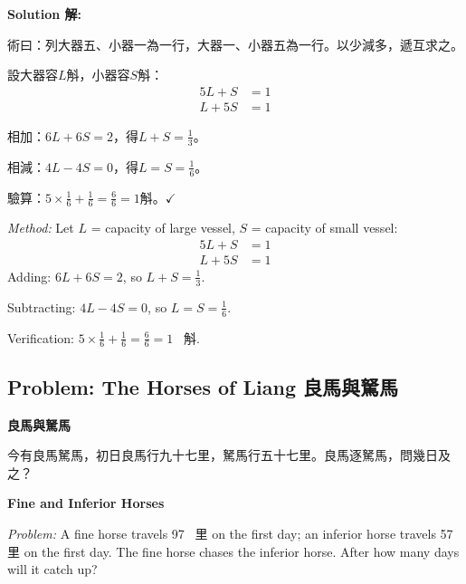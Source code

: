 \documentclass[11pt,a4paper]{article}
\newcommand{\zh}[1]{{\CJKfamily{\CJKrmdefault} #1}}
\newenvironment{chside}{%
  \begin{minipage}[t]{0.48\textwidth}%
  \setlength{\parindent}{1.5em}%
  \linespread{1.25}\selectfont%
  \small%
}{%
  \end{minipage}%
}
\newenvironment{enside}{%
  \hfill\begin{minipage}[t]{0.48\textwidth}%
  \setlength{\parindent}{1em}%
  \linespread{1.15}\selectfont%
  \small%
}{%
  \end{minipage}%
}
\newenvironment{solution}{%
  \par\medskip\noindent\textbf{\textcolor{notecolor}{Solution \zh{解}:}}\par\nopagebreak
  \small\setlength{\parindent}{1em}%
}{%
  \par\medskip%
}
\begin{document}
\begin{solution}
\noindent\begin{chside}
\zh{術曰：列大器五、小器一為一行，大器一、小器五為一行。以少減多，遞互求之。}

設大器容$L$斛，小器容$S$斛：
\begin{align*}
5L + S &= 1 \\
L + 5S &= 1
\end{align*}

相加：$6L + 6S = 2$，得$L + S = \frac{1}{3}$。

相減：$4L - 4S = 0$，得$L = S = \frac{1}{6}$。

驗算：$5 \times \frac{1}{6} + \frac{1}{6} = \frac{6}{6} = 1$斛。$\checkmark$
\end{chside}%
\begin{enside}
\textit{Method:} Let $L$ = capacity of large vessel, $S$ = capacity of
small vessel:
\begin{align*}
5L + S &= 1 \\
L + 5S &= 1
\end{align*}
Adding: $6L + 6S = 2$, so $L + S = \frac{1}{3}$.

Subtracting: $4L - 4S = 0$, so $L = S = \frac{1}{6}$.

Verification: $5 \times \frac{1}{6} + \frac{1}{6} = \frac{6}{6} = 1$~\zh{斛}.\checkmark
\end{enside}
\end{solution}

\subsection{Problem: The Horses of Liang \zh{良馬與駑馬}}

\noindent\begin{chside}
\noindent\textbf{良馬與駑馬}

\zh{今有良馬駑馬，初日良馬行九十七里，駑馬行五十七里。良馬逐駑馬，問幾日及之？}
\end{chside}%
\begin{enside}
\noindent\textbf{Fine and Inferior Horses}

\textit{Problem:} A fine horse travels 97~\zh{里} on the first day; an inferior
horse travels 57~\zh{里} on the first day. The fine horse chases the inferior
horse. After how many days will it catch up?
\end{enside}
\end{document}
